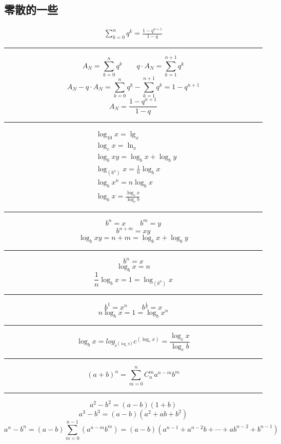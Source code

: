 \begin{center}\section{ 零散的一些}\end{center}
\begin{align}
\sum\limits_{k=0}^{n}q^k = \frac{1-q^{n+1}}{1-q}
\end{align}
\noindent\rule{\textwidth}{0.4pt}
$$A_N = \sum\limits_{k = 0}^{n}q^k \qquad q\cdot A_N = \sum\limits_{k = 1}^{n+1}q^k$$
$$A_N - q\cdot A_N = \sum\limits_{k = 0}^{n}q^k -\sum\limits_{k=1}^{n+1}q^k = 1-q^{n+1}$$
$$A_N = \frac{1-q^{n+1}}{1-q}$$
\noindent\rule{\textwidth}{0.4pt}

\begin{align}
&\log_{10}{x} = \lg_{x} \\
&\log_{e}{x} = \ln_{x}\\
&\log_{b}{xy} = \log_{b}{x} + \log_{b}{y}\\
&\log_{\left(b^n\right)}{x} = \frac{1}{n}\log_{b}{x} \\
&\log_{b}{x^n} = n\log_{b}{x} \\
&\log_{b}{x} = \frac{\log_{c}{x}}{\log_{c}{b}}
\end{align}
\noindent\rule{\textwidth}{0.4pt}
$$b^n = x\qquad b^m =y$$
$$b^{n+m} = xy$$
$$\log_{b}{xy} = n + m = \log_{b}{x} + \log_{b}{y}$$
\noindent\rule{\textwidth}{0.4pt}
$$b^n = x$$
$$\log_{b}{x} = n$$
$$\frac{1}{n}\log_{b}{x}= 1 = \log_{\left(b^n\right)}{x}$$
\noindent\rule[\fill]{\textwidth}{0.4pt}
$$b^1 = x^n \qquad b^{\frac{1}{n}} = x$$
$$n\log_{b}{x} = 1 = \log_{b}{x^n}$$
\noindent\rule[\fill]{\textwidth}{0.4pt}
$$\log_{b}{x} = log_{c^{\left(\log_{c}{b}\right)}}{c^{\left(\log_{c}{x}\right)}}=\frac{\log_{c}{x}}{\log_{c}{b}}$$
\noindent\rule[\fill]{\textwidth}{0.4pt}
$$\left(a+b\right)^n=\sum_{m = 0}^{n} C_n^m a^{n-m}b^m $$
\noindent\rule[\fill]{\textwidth}{0.4pt}
$$a^2-b^2=\left(a-b\right)\left(1+b\right)$$
$$a^3-b^3=\left(a-b\right)\left(a^2+ab+b^2\right)$$
$$a^n-b^n=\left(a-b\right)\sum_{m=0}^{n-1}\left(a^{n-m}b^{m}\right)=\left(a-b\right)\left(a^{n-1}+a^{n-2}b+\cdots+ab^{n-2}+b^{n-1}\right)$$
